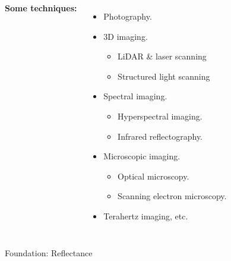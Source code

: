 \documentclass{beamer}
\begin{document}
{\begin{frame}[t]
\begin{columns}[t]
    \textbf{Some techniques:}
       \begin{itemize}
            \item<7-> Photography.
            \item<8-> 3D imaging.
                \begin{itemize}
                    \item<8-> LiDAR \& laser scanning
                    \item<8-> Structured light scanning
                \end{itemize}
            \item<9-> Spectral imaging.
                \begin{itemize}
                    \item<9-> Hyperspectral imaging.
                    \item<9-> Infrared reflectography.
                \end{itemize}
            \item<10-> Microscopic imaging.
                \begin{itemize}
                    \item<10-> Optical microscopy.
                    \item<10-> Scanning electron microscopy.
                \end{itemize}
            \item<11-> Terahertz imaging, etc.
        \end{itemize}
        
    \end{columns}
    \vspace{-1cm}
\end{frame}




\begin{frame}{Foundation: Reflectance}


\end{frame}}
\end{document}
